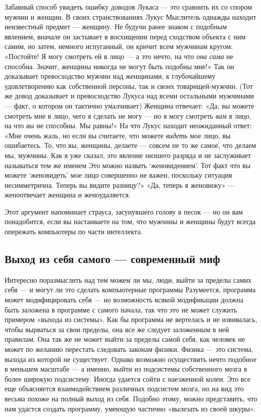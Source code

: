 \documentclass[../main.tex]{subfiles}
\begin{document}
Забавный способ увидеть ошибку доводов Лукаса --- это сравнить их со спором мужчин и женщин. В своих странствованиях Лукус Мыслитель однажды находит неизвестный предмет --- женщину. Не будучи ранее знаком с подобным явлением, вначале он застывает в восхищении перед сходством объекта с ним самим, но затем, немного испуганный, он кричит всем мужчинам кругом: «Постойте! Я могу смотреть ей в лицо --- а это нечто, на что \emph{она сама} не способна. Значит, женщины никогда не могут быть подобны мне!» Так он доказывает превосходство мужчин над женщинами, к глубочайшему удовлетворению как собственной персоны, так и своих товарищей-мужчин. (Тот же довод доказывает и превосходство Лукуса над всеми остальными мужчинами --- факт, о котором он тактично умалчивает) Женщина отвечает: «Да, вы можете смотреть мне в лицо, чего я сделать не могу --- но я могу смотреть \emph{вам} в лицо, на что \emph{вы} не способны. Мы равны!» На что Лукус находит неожиданный ответ: «Мне очень жаль, но если вы считаете, что можете \emph{видеть} мое лицо, вы ошибаетесь. То, что вы, женщины, делаете --- совсем не то же самое, что делаем мы, мужчины. Как я уже сказал, это явление низшего разряда и не заслуживает называться тем же именем Это можно назвать \enquote*{женовидением}. Тот факт что вы можете \enquote*{женовидеть} мое лицо совершенно не важен, поскольку ситуация несимметрична. Теперь вы видите разницу?» «Да, теперь я женовижу» --- женоотвечает женщина и женоудаляется.

Этот аргумент напоминает страуса, засунувшего голову в песок --- но он вам понадобится, если вы настаиваете на том, что мужчины и женщины будут всегда опережать компьютеры по части интеллекта.


\subsection{Выход из себя самого --- современный миф}

Интересно поразмыслить над тем можем ли мы, люди, выйти за пределы самих себя --- и могут ли это сделать компьютерные программы Разумеется, программа может модифицировать себя --- но возможность всякой модификации должна быть заложена в программе с самого начала, так что это не может служить примером «выхода из системы». Как бы программа не вертелась и не извивалась, чтобы вырваться за свои пределы, она все же следует заложенным в ней правилам. Она так же не может выйти за пределы самой себя, как человек не может по желанию перестать следовать законам физики. Физика --- это система, выхода из которой не существует. Однако возможно осуществить нечто подобное в меньшем масштабе --- а именно, выйти из подсистемы собственного мозга в более широкую подсистему. Иногда удается сойти с наезженной колеи. Это все еще объясняется взаимодействием различных подсистем мозга, но на вид это весьма похоже на полный выход из себя. Подобно этому, можно представить, что нам удастся создать программу, умеющую частично «вылезать из своей шкуры».
\end{document}
